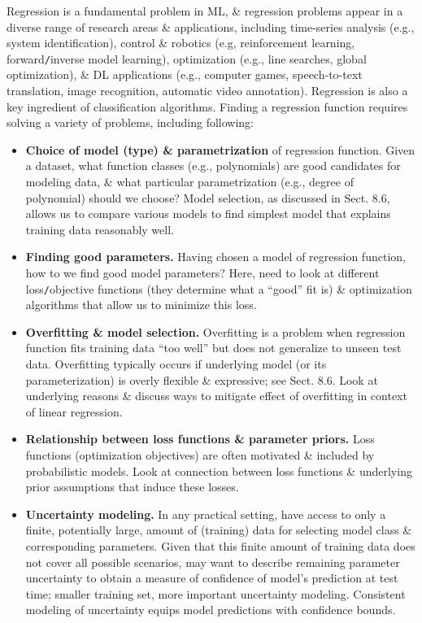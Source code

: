 \documentclass{article}
\begin{document}
\begin{itemize}
	Regression is a fundamental problem in ML, \& regression problems appear in a diverse range of research areas \& applications, including time-series analysis (e.g., system identification), control \& robotics (e.g, reinforcement learning, forward{\tt/}inverse model learning), optimization (e.g., line searches, global optimization), \& DL applications (e.g., computer games, speech-to-text translation, image recognition, automatic video annotation). Regression is also a key ingredient of classification algorithms. Finding a regression function requires solving a variety of problems, including following:
	\begin{itemize}
		\item {\bf Choice of model (type) \& parametrization} of regression function. Given a dataset, what function classes (e.g., polynomials) are good candidates for modeling data, \& what particular parametrization (e.g., degree of polynomial) should we choose? Model selection, as discussed in Sect. 8.6, allows us to compare various models to find simplest model that explains training data reasonably well.
		\item {\bf Finding good parameters.} Having chosen a model of regression function, how to we find good model parameters? Here, need to look at different loss{\tt/}objective functions (they determine what a ``good'' fit is) \& optimization algorithms that allow us to minimize this loss.
		\item {\bf Overfitting \& model selection.} Overfitting is a problem when regression function fits training data ``too well'' but does not generalize to unseen test data. Overfitting typically occurs if underlying model (or its parameterization) is overly flexible \& expressive; see Sect. 8.6. Look at underlying reasons \& discuss ways to mitigate effect of overfitting in context of linear regression.
		\item {\bf Relationship between loss functions \& parameter priors.} Loss functions (optimization objectives) are often motivated \& included by probabilistic models. Look at connection between loss functions \& underlying prior assumptions that induce these losses.
		\item {\bf Uncertainty modeling.} In any practical setting, have access to only a finite, potentially large, amount of (training) data for selecting model class \& corresponding parameters. Given that this finite amount of training data does not cover all possible scenarios, may want to describe remaining parameter uncertainty to obtain a measure of confidence of model's prediction at test time; smaller training set, more important uncertainty modeling. Consistent modeling of uncertainty equips model predictions with confidence bounds.

\end{itemize}
\end{itemize}
\end{document}
